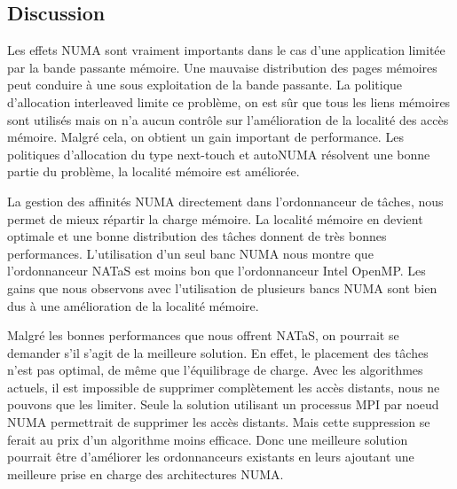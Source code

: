 \subsection{Discussion}
Les effets NUMA sont vraiment importants dans le cas d'une application limitée par la bande passante mémoire.
%
Une mauvaise distribution des pages mémoires peut conduire à une sous exploitation de la bande passante.
%
La politique d'allocation interleaved limite ce problème, on est sûr que tous les liens mémoires sont utilisés mais on n'a aucun contrôle sur l'amélioration de la localité des accès mémoire.
%
Malgré cela, on obtient un gain important de performance.
%
Les politiques d'allocation du type next-touch et autoNUMA résolvent une bonne partie du problème, la localité mémoire est améliorée.



La gestion des affinités NUMA directement dans l'ordonnanceur de tâches, nous permet de mieux répartir la charge mémoire.
%
La localité mémoire en devient optimale et une bonne distribution des tâches donnent de très bonnes performances.
%
L'utilisation d'un seul banc NUMA nous montre que l'ordonnanceur NATaS est moins bon que l'ordonnanceur Intel OpenMP.
%
Les gains que nous observons avec l'utilisation de plusieurs bancs NUMA sont bien dus à une amélioration de la localité mémoire.


Malgré les bonnes performances que nous offrent NATaS, on pourrait se demander s'il s'agit de la meilleure solution.
%
En effet, le placement des tâches n'est pas optimal, de même que l'équilibrage de charge.
%
Avec les algorithmes actuels, il est impossible de supprimer complètement les accès distants, nous ne pouvons que les limiter.
%
Seule la solution utilisant un processus MPI par noeud NUMA permettrait de supprimer les accès distants.
%
Mais cette suppression se ferait au prix d'un algorithme moins efficace.
%
Donc une meilleure solution pourrait être d'améliorer les ordonnanceurs existants en leurs ajoutant une meilleure prise en charge des architectures NUMA.
